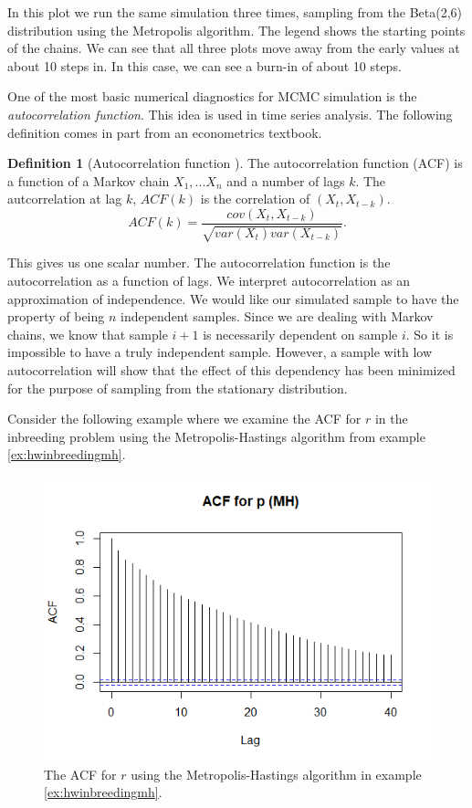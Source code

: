 \documentclass[11pt]{amsart}
\theoremstyle{theorem} %
\theoremstyle{definition}                  %
\newtheorem{defn}[thm]{Definition}
\theoremstyle{example}                       %
\theoremstyle{remark}                       %
\numberwithin{equation}{section}
\begin{document}
In this plot we run the same simulation three times, sampling from the Beta(2,6) distribution using the Metropolis algorithm. The legend shows the starting points of the chains. We can see that all three plots move away from the early values at about 10 steps in. In this case, we can see a burn-in of about 10 steps.

One of the most basic numerical diagnostics for MCMC simulation is the \emph{autocorrelation function}. This idea is used in time series analysis. The following definition comes in part from an econometrics textbook.

\begin{defn}[{Autocorrelation function \cite[p.~182]{dogs} \cite[p.~532]{stock}}]

The autocorrelation function (ACF) is a function of a Markov chain $X_1,... X_n$ and a number of lags $k$. The autcorrelation at lag $k$, $ACF(k)$ is the correlation of $(X_t, X_{t-k})$.
\[ACF(k)=\frac{cov(X_t, X_{t-k})}{\sqrt{var(X_t)var(X_{t-k})}}.\]

\end{defn}

This gives us one scalar number. The autocorrelation function is the autocorrelation as a function of lags. We interpret autocorrelation as an approximation of independence. We would like our simulated sample to have the property of being $n$ independent samples. Since we are dealing with Markov chains, we know that sample $i+1$ is necessarily dependent on sample $i$. So it is impossible to have a truly independent sample. However, a sample with low autocorrelation will show that the effect of this dependency has been minimized for the purpose of sampling from the stationary distribution. 

Consider the following example where we examine the ACF for $r$ in the inbreeding problem using the Metropolis-Hastings algorithm from example \ref{ex:hwinbreedingmh}.

\begin{figure}[h]
    \centering
    \includegraphics[width= .65\textwidth]{ACFpMH.png}
    \caption{The ACF for $r$ using the Metropolis-Hastings algorithm in example \ref{ex:hwinbreedingmh}.}
    \label{fig:ACFpMH}
\end{figure}
\end{document}
